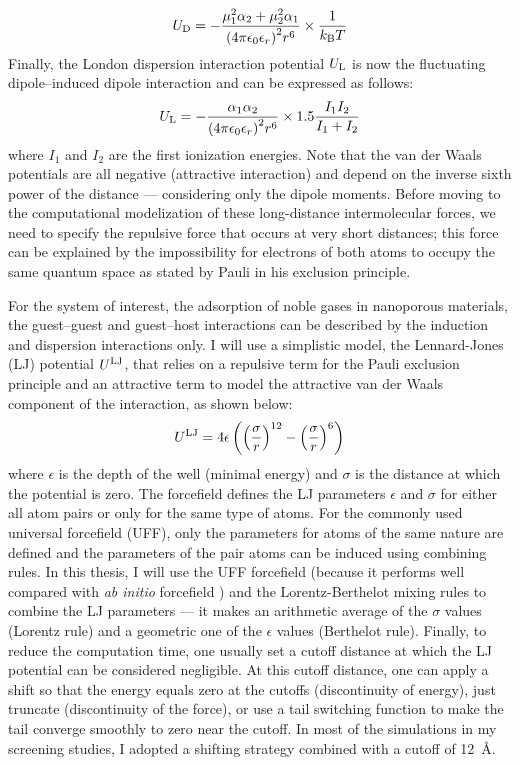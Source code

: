 \documentclass[main.tex]{subfiles}
\begin{document}
\begin{equation}\label{eq:debye}
  U_{\text{D}} = -\dfrac{\mu_1^2\alpha_2 + \mu_2^2\alpha_1}{{(4\pi\epsilon_0\epsilon_r)}^2r^6}\times\dfrac{1}{k_{\text{B}}T}
\end{equation}
Finally, the London dispersion interaction potential $U_{\text{L}}$ is now the fluctuating dipole--induced dipole interaction and can be expressed as follows:
\begin{equation}\label{eq:london}
  U_{\text{L}} = -\dfrac{\alpha_1\alpha_2}{{(4\pi\epsilon_0\epsilon_r)}^2r^6}\times1.5\dfrac{I_1 I_2}{I_1+I_2}
\end{equation}
where $I_1$ and $I_2$ are the first ionization energies. Note that the van der Waals potentials are all negative (attractive interaction) and depend on the inverse sixth power of the distance --- considering only the dipole moments. Before moving to the computational modelization of these long-distance intermolecular forces, we need to specify the repulsive force that occurs at very short distances; this force can be explained by the impossibility for electrons of both atoms to occupy the same quantum space as stated by Pauli in his exclusion principle.

For the system of interest, the adsorption of noble gases in nanoporous materials, the guest--guest and guest--host interactions can be described by the induction and dispersion interactions only. I will use a simplistic model, the Lennard-Jones (LJ) potential $U^{\text{LJ}}$,\autocite{LJ_1924} that relies on a repulsive term for the Pauli exclusion principle and an attractive term to model the attractive van der Waals component of the interaction, as shown below:
\begin{equation}\label{eq:LJ}
  U^{\text{LJ}} = 4\epsilon \left({\left(\dfrac{\sigma}{r}\right)}^{12} - {\left(\dfrac{\sigma}{r}\right)}^{6}\right)
\end{equation}
where $\epsilon$ is the depth of the well (minimal energy) and $\sigma$ is the distance at which the potential is zero. The forcefield defines the LJ parameters $\epsilon$ and $\sigma$ for either all atom pairs or only for the same type of atoms. For the commonly used universal forcefield (UFF),\autocite{rappe1992} only the parameters for atoms of the same nature are defined and the parameters of the pair atoms can be induced using combining rules. In this thesis, I will use the UFF forcefield (because it performs well compared with \emph{ab initio} forcefield \autocite{McDaniel_2015}) and the Lorentz-Berthelot mixing rules to combine the LJ parameters --- it makes an arithmetic average of the $\sigma$ values (Lorentz rule) and a geometric one of the $\epsilon$ values (Berthelot rule). Finally, to reduce the computation time, one usually set a cutoff distance at which the LJ potential can be considered negligible. At this cutoff distance, one can apply a shift so that the energy equals zero at the cutoffs (discontinuity of energy), just truncate (discontinuity of the force), or use a tail switching function to make the tail converge smoothly to zero near the cutoff. In most of the simulations in my screening studies, I adopted a shifting strategy combined with a cutoff of \SI{12}{\angstrom}.
\end{document}
